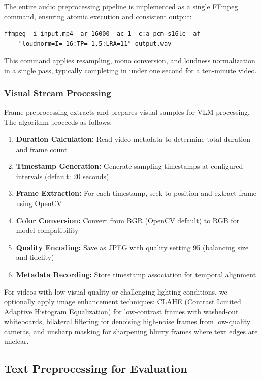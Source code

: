 The entire audio preprocessing pipeline is implemented as a single FFmpeg command, ensuring atomic execution and consistent output:

\begin{verbatim}
ffmpeg -i input.mp4 -ar 16000 -ac 1 -c:a pcm_s16le -af 
    "loudnorm=I=-16:TP=-1.5:LRA=11" output.wav
\end{verbatim}

This command applies resampling, mono conversion, and loudness normalization in a single pass, typically completing in under one second for a ten-minute video.

\subsubsection{Visual Stream Processing}

Frame preprocessing extracts and prepares visual samples for VLM processing. The algorithm proceeds as follows:

\begin{enumerate}
    \item \textbf{Duration Calculation:} Read video metadata to determine total duration and frame count
    \item \textbf{Timestamp Generation:} Generate sampling timestamps at configured intervals (default: 20 seconds)
    \item \textbf{Frame Extraction:} For each timestamp, seek to position and extract frame using OpenCV \cite{Bradski2000}
    \item \textbf{Color Conversion:} Convert from BGR (OpenCV default) to RGB for model compatibility
    \item \textbf{Quality Encoding:} Save as JPEG with quality setting 95 (balancing size and fidelity)
    \item \textbf{Metadata Recording:} Store timestamp association for temporal alignment
\end{enumerate}

For videos with low visual quality or challenging lighting conditions, we optionally apply image enhancement techniques: CLAHE (Contrast Limited Adaptive Histogram Equalization) for low-contrast frames with washed-out whiteboards, bilateral filtering for denoising high-noise frames from low-quality cameras, and unsharp masking for sharpening blurry frames where text edges are unclear.

\subsection{Text Preprocessing for Evaluation}

